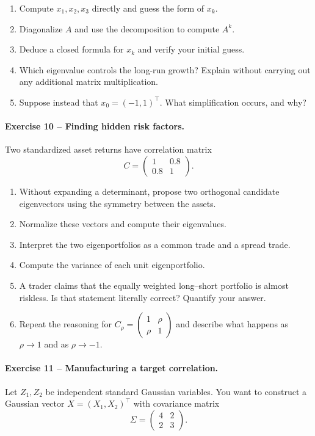 \documentclass[10pt]{article}
\begin{document}
\begin{enumerate}
\item Compute $x_1,x_2,x_3$ directly and guess the form of $x_k$.
\item Diagonalize $A$ and use the decomposition to compute $A^k$.
\item Deduce a closed formula for $x_k$ and verify your initial guess.
\item Which eigenvalue controls the long-run growth? Explain without carrying
out any additional matrix multiplication.
\item Suppose instead that $x_0=(-1,1)^\top$. What simplification occurs, and
why?
\end{enumerate}

\paragraph{Exercise 10 -- Finding hidden risk factors.}
Two standardized asset returns have correlation matrix
\[
C=\begin{pmatrix}1&0.8\\0.8&1\end{pmatrix}.
\]

\begin{enumerate}
\item Without expanding a determinant, propose two orthogonal candidate
eigenvectors using the symmetry between the assets.
\item Normalize these vectors and compute their eigenvalues.
\item Interpret the two eigenportfolios as a common trade and a spread trade.
\item Compute the variance of each unit eigenportfolio.
\item A trader claims that the equally weighted long--short portfolio is almost
riskless. Is that statement literally correct? Quantify your answer.
\item Repeat the reasoning for
$C_\rho=\begin{pmatrix}1&\rho\\\rho&1\end{pmatrix}$ and describe what happens
as $\rho\to1$ and as $\rho\to-1$.
\end{enumerate}

\paragraph{Exercise 11 -- Manufacturing a target correlation.}
Let $Z_1,Z_2$ be independent standard Gaussian variables. You want to construct
a Gaussian vector $X=(X_1,X_2)^\top$ with covariance matrix
\[
\Sigma=\begin{pmatrix}4&2\\2&3\end{pmatrix}.
\]
\end{document}
